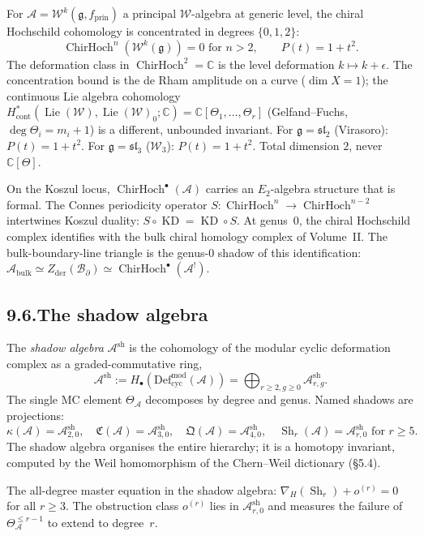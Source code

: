\documentclass[11pt,reqno]{amsart}
\theoremstyle{definition}
\theoremstyle{remark}
\providecommand{\cA}{\mathcal{A}}
\providecommand{\cB}{\mathcal{B}}
\providecommand{\Defcyc}{\mathrm{Def}_{\mathrm{cyc}}}
\providecommand{\Defcyc}{\mathrm{Def}_{\mathrm{cyc}}}
\numberwithin{equation}{section}
\begin{document}
For $\cA=\mathcal W^k(\mathfrak g,f_{\mathrm{prin}})$ a principal
$\mathcal W$-algebra at generic level, the chiral Hochschild cohomology
is concentrated in degrees $\{0,1,2\}$:
\[
\operatorname{ChirHoch}^n(\mathcal W^k(\mathfrak g))=0\text{ for }n>2,\qquad P(t)=1+t^2.
\]
The deformation class in $\operatorname{ChirHoch}^2=\mathbb C$ is the
level deformation $k\mapsto k+\epsilon$. The concentration bound is
the de Rham amplitude on a curve ($\dim X=1$); the continuous
Lie algebra cohomology
$H^*_{\mathrm{cont}}(\operatorname{Lie}(\mathcal W),\operatorname{Lie}(\mathcal W)_0;\mathbb C)=\mathbb C[\Theta_1,\ldots,\Theta_r]$
(Gelfand--Fuchs, $\deg\Theta_i=m_i+1$) is a different, unbounded
invariant. For $\mathfrak g=\mathfrak{sl}_2$ (Virasoro):
$P(t)=1+t^2$. For $\mathfrak g=\mathfrak{sl}_3$ ($\mathcal W_3$):
$P(t)=1+t^2$. Total dimension $2$, never $\mathbb C[\Theta]$.

On the Koszul locus, $\operatorname{ChirHoch}^\bullet(\cA)$ carries an
$E_2$-algebra structure that is formal. The Connes periodicity
operator $S\colon\operatorname{ChirHoch}^n\to\operatorname{ChirHoch}^{n-2}$
intertwines Koszul duality: $S\circ\operatorname{KD}=\operatorname{KD}\circ S$.
At genus~$0$, the chiral Hochschild complex identifies with the bulk
chiral homology complex of Volume~II. The bulk-boundary-line triangle
is the genus-$0$ shadow of this identification:
$\cA_{\mathrm{bulk}}\simeq Z_{\mathrm{der}}(\cB_\partial)\simeq\operatorname{ChirHoch}^\bullet(\cA^!)$.

\subsection*{9.6.\enspace The shadow algebra}

The \emph{shadow algebra} $\cA^{\mathrm{sh}}$ is the cohomology of the
modular cyclic deformation complex as a graded-commutative ring,
\[
\cA^{\mathrm{sh}}:=H_\bullet(\Defcyc^{\mathrm{mod}}(\cA))=\bigoplus_{r\ge 2,g\ge 0}\cA^{\mathrm{sh}}_{r,g}.
\]
The single MC element $\Theta_\cA$ decomposes by degree and genus.
Named shadows are projections:
\[
\kappa(\cA)=\cA^{\mathrm{sh}}_{2,0},\quad\mathfrak C(\cA)=\cA^{\mathrm{sh}}_{3,0},\quad\mathfrak Q(\cA)=\cA^{\mathrm{sh}}_{4,0},\quad\operatorname{Sh}_r(\cA)=\cA^{\mathrm{sh}}_{r,0}\text{ for }r\ge 5.
\]
The shadow algebra organises the entire hierarchy; it is a homotopy
invariant, computed by the Weil homomorphism of the Chern--Weil
dictionary (\S5.4).

The all-degree master equation in the shadow algebra:
$\nabla_H(\operatorname{Sh}_r)+o^{(r)}=0$ for all $r\ge 3$. The
obstruction class $o^{(r)}$ lies in $\cA^{\mathrm{sh}}_{r,0}$ and
measures the failure of $\Theta^{\le r-1}_\cA$ to extend to degree~$r$.
\end{document}
